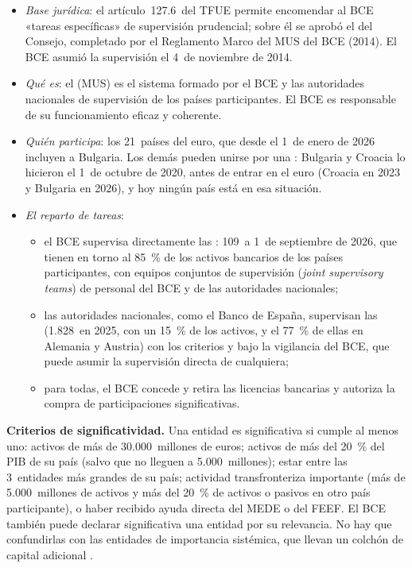 \documentclass[11pt]{article}
\begin{document}
\begin{itemize}
\item \emph{Base jurídica}: el artículo~127.6~del TFUE permite encomendar al BCE «tareas específicas» de supervisión prudencial; sobre él se aprobó el  del Consejo, completado por el Reglamento Marco del MUS del BCE (2014)\nocite{RegUE2013MUS}. El BCE asumió la supervisión el 4~de noviembre de 2014.
\item \emph{Qué es}: el  (MUS) es el sistema formado por el BCE y las autoridades nacionales de supervisión de los países participantes. El BCE es responsable de su funcionamiento eficaz y coherente.
\item \emph{Quién participa}: los 21~países del euro, que desde el 1~de enero de 2026 incluyen a Bulgaria. Los demás pueden unirse por una : Bulgaria y Croacia lo hicieron el 1~de octubre de 2020, antes de entrar en el euro (Croacia en 2023 y Bulgaria en 2026), y hoy ningún país está en esa situación\nocite{BCE2020CooperacionEstrecha,BCE2026InformeSupervision}.
\item \emph{El reparto de tareas}:
  \begin{itemize}
  \item el BCE supervisa directamente las : 109~a 1~de septiembre de 2026, que tienen en torno al 85~\% de los activos bancarios de los países participantes, con equipos conjuntos de supervisión (\emph{joint supervisory teams}) de personal del BCE y de las autoridades nacionales\nocite{BCE2026ListaEntidades};
  \item las autoridades nacionales, como el Banco de España, supervisan las  (1.828~en 2025, con un 15~\% de los activos, y el 77~\% de ellas en Alemania y Austria) con los criterios y bajo la vigilancia del BCE, que puede asumir la supervisión directa de cualquiera\nocite{BCE2026InformeSupervision};
  \item para todas, el BCE concede y retira las licencias bancarias y autoriza la compra de participaciones significativas.
  \end{itemize}
\end{itemize}

\begin{anotaciones}
\textbf{Criterios de significatividad.} Una entidad es significativa si cumple al menos uno: activos de más de 30.000~millones de euros; activos de más del 20~\% del PIB de su país (salvo que no lleguen a 5.000~millones); estar entre las 3~entidades más grandes de su país; actividad transfronteriza importante (más de 5.000~millones de activos y más del 20~\% de activos o pasivos en otro país participante), o haber recibido ayuda directa del MEDE o del FEEF\nocite{RegUE2013MUS}. El BCE también puede declarar significativa una entidad por su relevancia. No hay que confundirlas con las entidades de importancia sistémica, que llevan un colchón de capital adicional .
\end{anotaciones}
\end{document}
